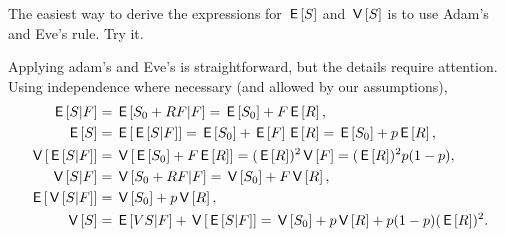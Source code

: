 \documentclass[queueing-book.tex]{subfiles}
\begin{document}
\begin{exercise}
The easiest way to derive the expressions for $\E S$ and $\V S$ is to use Adam's and Eve's rule. Try it.
\begin{solution}
Applying adam's and Eve's is  straightforward, but the details require attention. Using independence where necessary (and allowed by our assumptions),
\begin{align*}
  \E{S|F} &= \E{S_{0} + R F|F} = \E{S_{0}} + F \E{R}, \\
  \E S &= \E{\E{S|F}} = \E{S_{0}} + \E F \E{R} = \E{S_{0}} + p \E{R}, \\
  \V{\E{S|F}} &= \V{\E{S_{0}} + F \E{R}} = (\E R)^2 \V F = (\E R)^2 p (1-p), \\
  \V{S|F} &=\V{S_0 + R F|F} = \V{S_{0}} + F \V R,\\
  \E{\V{S|F}} &= \V{S_0} + p \V R, \\
  \V S &= \E{V{S|F}} + \V{\E{S|F}} = \V{S_{0}} + p \V R + p(1-p)(\E R)^{2}.
\end{align*}
\end{solution}
\end{exercise}



\end{document}
